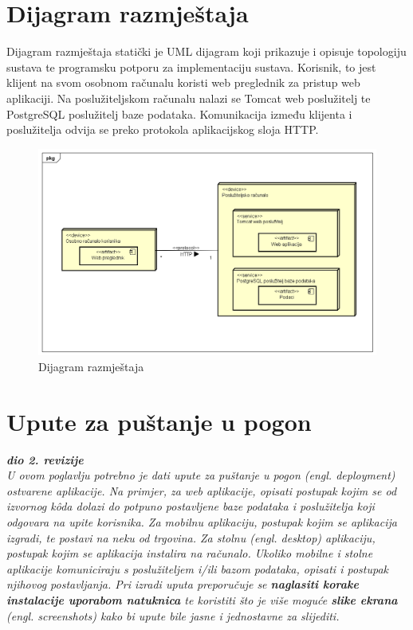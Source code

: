 			\eject 
		
		
		\section{Dijagram razmještaja}
		
			Dijagram razmještaja statički je UML dijagram koji prikazuje i opisuje topologiju sustava te programsku potporu za implementaciju sustava. Korisnik, to jest klijent na svom osobnom računalu koristi web preglednik za pristup web aplikaciji. Na poslužiteljskom računalu nalazi se Tomcat web poslužitelj te PostgreSQL poslužitelj baze podataka. Komunikacija između klijenta i poslužitelja odvija se preko protokola aplikacijskog sloja HTTP.
			
			\begin{figure}[H]
				\includegraphics[scale=0.5]{dijagrami/DeployDiagram} %
				\centering
				\caption{Dijagram razmještaja}
				\label{fig:dijagramRazmjestaja}
			\end{figure}
			
			 
			\eject 
		
		\section{Upute za puštanje u pogon}
		
			\textbf{\textit{dio 2. revizije}}\\
		
			 \textit{U ovom poglavlju potrebno je dati upute za puštanje u pogon (engl. deployment) ostvarene aplikacije. Na primjer, za web aplikacije, opisati postupak kojim se od izvornog kôda dolazi do potpuno postavljene baze podataka i poslužitelja koji odgovara na upite korisnika. Za mobilnu aplikaciju, postupak kojim se aplikacija izgradi, te postavi na neku od trgovina. Za stolnu (engl. desktop) aplikaciju, postupak kojim se aplikacija instalira na računalo. Ukoliko mobilne i stolne aplikacije komuniciraju s poslužiteljem i/ili bazom podataka, opisati i postupak njihovog postavljanja. Pri izradi uputa preporučuje se \textbf{naglasiti korake instalacije uporabom natuknica} te koristiti što je više moguće \textbf{slike ekrana} (engl. screenshots) kako bi upute bile jasne i jednostavne za slijediti.}
			
